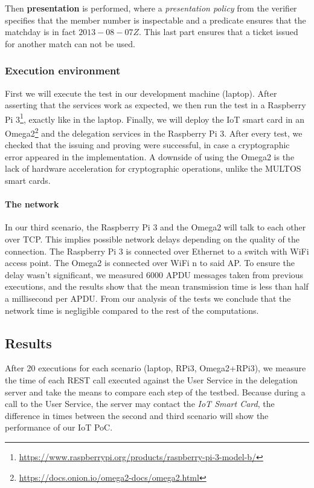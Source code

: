 Then \textbf{presentation} is performed, where a \textit{presentation policy} from the verifier specifies that the member number is inspectable and a predicate ensures that the matchday is in fact $2013-08-07Z$. This last part ensures that a ticket issued for another match can not be used.

\hfil

\subsubsection{Execution environment}

First we will execute the test in our development machine (laptop). After asserting that the services work as expected, we then run the test in a Raspberry Pi 3\footnote{\url{https://www.raspberrypi.org/products/raspberry-pi-3-model-b/}}, exactly like in the laptop. Finally, we will deploy the IoT smart card in an Omega2\footnote{\url{https://docs.onion.io/omega2-docs/omega2.html}} and the delegation services in the Raspberry Pi 3. After every test, we checked that the issuing and proving were successful, in case a cryptographic error appeared in the implementation.
A downside of using the Omega2 is the lack of hardware acceleration for cryptographic operations, unlike the MULTOS smart cards.



\paragraph{The network} In our third scenario, the Raspberry Pi 3 and the Omega2 will talk to each other over TCP. This implies possible network delays depending on the quality of the connection. The Raspberry Pi 3 is connected over Ethernet to a switch with WiFi access point. The Omega2 is connected over WiFi n to said AP. To ensure the delay wasn't significant, we measured 6000 APDU messages taken from previous executions, and the results show that the mean transmission time is less than half a millisecond per APDU. From our analysis of the tests we conclude that the network time is negligible compared to the rest of the computations.



\subsection{Results}

After 20 executions for each scenario (laptop, RPi3, Omega2+RPi3), we measure the time of each REST call executed against the User Service in the delegation server and take the means to compare each step of the testbed. Because during a call to the User Service, the server may contact the \textit{IoT Smart Card}, the difference in times between the second and third scenario will show the performance of our IoT PoC.

